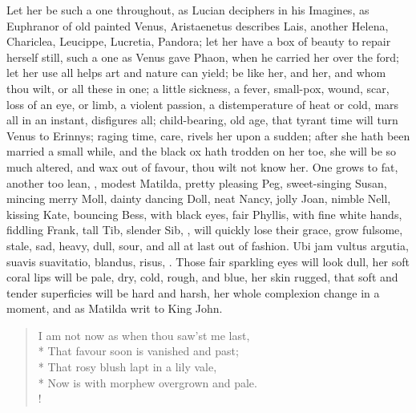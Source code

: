 Let her be such a one throughout, as Lucian deciphers in his Imagines,
as Euphranor of old painted Venus, Aristaenetus describes Lais, another
Helena, Chariclea, Leucippe, Lucretia, Pandora; let her have a box of
beauty to repair herself still, such a one as Venus gave Phaon, when he
carried her over the ford; let her use all helps art and nature can
yield; be like her, and her, and whom thou wilt, or all these in one; a
little sickness, a fever, small-pox, wound, scar, loss of an eye, or
limb, a violent passion, a distemperature of heat or cold, mars all in
an instant, disfigures all; child-bearing, old age, that tyrant time
will turn Venus to Erinnys; raging time, care, rivels her upon a
sudden; after she hath been married a small while, and the black ox
hath trodden on her toe, she will be so much altered, and wax out of
favour, thou wilt not know her. One grows to fat, another too lean,
\etc{}, modest Matilda, pretty pleasing Peg, sweet-singing Susan, mincing
merry Moll, dainty dancing Doll, neat Nancy, jolly Joan, nimble Nell,
kissing Kate, bouncing Bess, with black eyes, fair Phyllis, with fine
white hands, fiddling Frank, tall Tib, slender Sib, \etc{}, will quickly
lose their grace, grow fulsome, stale, sad, heavy, dull, sour, and all
at last out of fashion. Ubi jam vultus argutia, suavis suavitatio,
blandus, risus, \etc{}. Those fair sparkling eyes will look dull, her soft
coral lips will be pale, dry, cold, rough, and blue, her skin rugged,
that soft and tender superficies will be hard and harsh, her whole
complexion change in a moment, and as Matilda writ to King John.
%
\begin{verse}%
I am not now as when thou saw'st me last,\\*
That favour soon is vanished and past;\\*
That rosy blush lapt in a lily vale,\\*
Now is with morphew overgrown and pale.\\!
\end{verse}%

